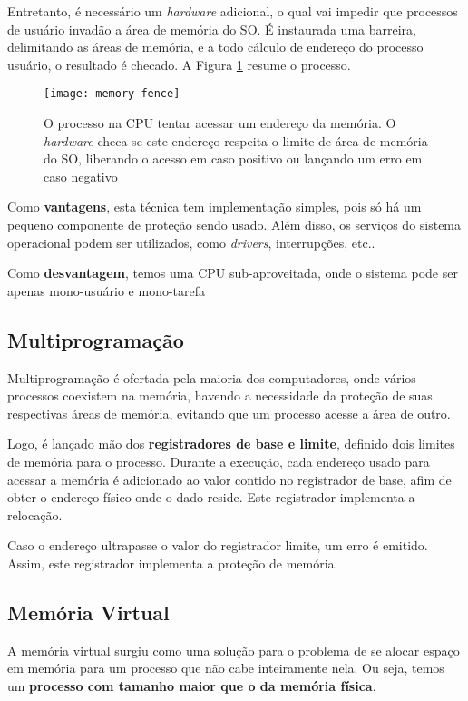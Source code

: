 Entretanto, é necessário um \textit{hardware} adicional, o qual vai impedir que processos de usuário invadão a área de memória do SO. É instaurada uma barreira, delimitando as áreas de memória, e a todo cálculo de endereço do processo usuário, o resultado é checado. A Figura \ref{fig:memory-fence} resume o processo.

\begin{figure}
  \centering
  \texttt{[image: memory-fence]}
  \caption{O processo na CPU tentar acessar um endereço da memória. O \textit{hardware} checa se este endereço respeita o limite de área de memória do SO, liberando o acesso em caso positivo ou lançando um erro em caso negativo}
  \label{fig:memory-fence}
\end{figure}

Como \textbf{vantagens}, esta técnica tem implementação simples, pois só há um pequeno componente de proteção sendo usado. Além disso, os serviços do sistema operacional podem ser utilizados, como \textit{drivers}, interrupções, etc..

Como \textbf{desvantagem}, temos uma CPU sub-aproveitada, onde o sistema pode ser apenas mono-usuário e mono-tarefa






\subsection{Multiprogramação}
Multiprogramação é ofertada pela maioria dos computadores, onde vários processos coexistem na memória, havendo a necessidade da proteção de suas respectivas áreas de memória, evitando que um processo acesse a área de outro.

Logo, é lançado mão dos \textbf{registradores de base e limite}, definido dois limites de memória para o processo. Durante a execução, cada endereço usado para acessar a memória é adicionado ao valor contido no registrador de base, afim de obter o endereço físico onde o dado reside. Este registrador implementa a relocação.

Caso o endereço ultrapasse o valor do registrador limite, um erro é emitido. Assim, este registrador implementa a proteção de memória.







\subsection{Memória Virtual}
A memória virtual surgiu como uma solução para o problema de se alocar espaço em memória para um processo que não cabe inteiramente nela. Ou seja, temos um \textbf{processo com tamanho maior que o da memória física}.

